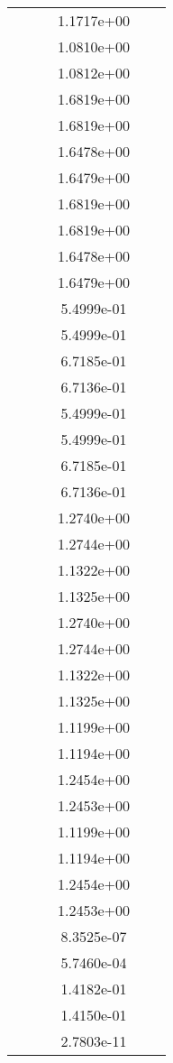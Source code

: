 \begin{xltabular}{\textwidth}{r|rS[table-format=1.3e+2]S[table-format=1.4e+2]S[table-format=1.4e+2]S[table-format=-1.5]}
&  &  & 1.1717e+00 & & \\
&  &  & 1.0810e+00 & & \\
&  &  & 1.0812e+00 & & \\
&  &  & 1.6819e+00 & & \\
&  &  & 1.6819e+00 & & \\
&  &  & 1.6478e+00 & & \\
&  &  & 1.6479e+00 & & \\
&  &  & 1.6819e+00 & & \\
&  &  & 1.6819e+00 & & \\
&  &  & 1.6478e+00 & & \\
&  &  & 1.6479e+00 & & \\
&  &  & 5.4999e-01 & & \\
&  &  & 5.4999e-01 & & \\
&  &  & 6.7185e-01 & & \\
&  &  & 6.7136e-01 & & \\
&  &  & 5.4999e-01 & & \\
&  &  & 5.4999e-01 & & \\
&  &  & 6.7185e-01 & & \\
&  &  & 6.7136e-01 & & \\
&  &  & 1.2740e+00 & & \\
&  &  & 1.2744e+00 & & \\
&  &  & 1.1322e+00 & & \\
&  &  & 1.1325e+00 & & \\
&  &  & 1.2740e+00 & & \\
&  &  & 1.2744e+00 & & \\
&  &  & 1.1322e+00 & & \\
&  &  & 1.1325e+00 & & \\
&  &  & 1.1199e+00 & & \\
&  &  & 1.1194e+00 & & \\
&  &  & 1.2454e+00 & & \\
&  &  & 1.2453e+00 & & \\
&  &  & 1.1199e+00 & & \\
&  &  & 1.1194e+00 & & \\
&  &  & 1.2454e+00 & & \\
&  &  & 1.2453e+00 & & \\
&  &  & 8.3525e-07 & & \\
&  &  & 5.7460e-04 & & \\
&  &  & 1.4182e-01 & & \\
&  &  & 1.4150e-01 & & \\
&  &  & 2.7803e-11 & & \\

\end{xltabular}
